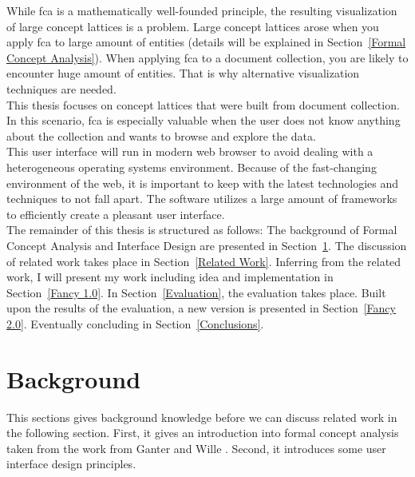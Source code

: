 \documentclass[11pt]{report}
\begin{document}
 

   
 While \acrshort{fca} is a mathematically well-founded principle, the resulting visualization of large concept lattices is a problem. Large concept lattices arose when you apply \acrshort{fca} to large amount of entities (details will be explained in Section~\ref{Formal Concept Analysis}). When applying \acrshort{fca} to a document collection, you are likely to encounter huge amount of entities. That is why alternative visualization techniques are needed. \\
 
  This thesis focuses on concept lattices that were built from document collection. In this scenario, \acrshort{fca} is especially valuable when the user does not know anything about the collection and wants to browse and explore the data. \\
  
 This user interface will run in modern web browser to avoid dealing with a heterogeneous operating systems environment. Because of the fast-changing environment of the web, it is important to keep with the latest technologies and techniques to not fall apart. The software utilizes a large amount of frameworks to efficiently create a pleasant user interface. \\
    
 The remainder of this thesis is structured as follows: The background of Formal Concept Analysis and Interface Design are presented in Section~\ref{Background}. The discussion of related work takes place in Section~\ref{Related Work}. Inferring from the related work, I will present my work including idea and implementation in Section~\ref{Fancy 1.0}. In Section~\ref{Evaluation}, the evaluation takes place. Built upon the results of the evaluation, a new version is presented in Section~\ref{Fancy 2.0}. Eventually concluding in Section~\ref{Conclusions}.
 
\chapter{Background}
\label{Background}

This sections gives background knowledge before we can discuss related work in the following section. First, it gives an introduction into formal concept analysis taken from the work from Ganter and Wille \cite{Ganter2012}. Second, it introduces some user interface design principles.
\end{document}
